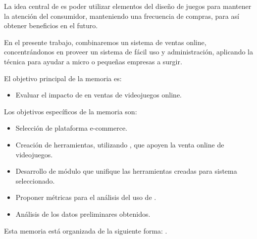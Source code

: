 La idea central de  {\GAM} es poder utilizar elementos del diseño de juegos
para mantener la atención del consumidor, manteniendo una frecuencia de compras,
para así obtener beneficios en el futuro.

En el presente trabajo, combinaremos un sistema de ventas online, concentrándonos
en proveer un sistema de fácil uso y administración, aplicando la técnica {\GAM}
para ayudar a micro o pequeñas empresas a surgir.

El objetivo principal de la memoria es:

\begin{itemize}
    \item Evaluar el impacto de {\GAM} en ventas de videojuegos online.
\end{itemize}

Los objetivos específicos de la memoria son:
\begin{itemize}
    \item Selección de plataforma e-commerce.
    \item Creación de herramientas, utilizando {\GAM}, que apoyen la
          venta online de videojuegos.
    \item Desarrollo de módulo que unifique las herramientas creadas para sistema
          seleccionado.
    \item Proponer métricas para el análisis del uso de {\GAM}.
    \item Análisis de los datos preliminares obtenidos.
\end{itemize}

Esta memoria está organizada de la siguiente forma:
.

